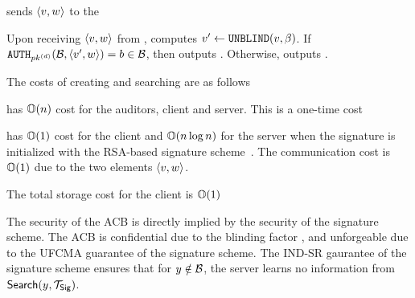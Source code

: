 \begin{algorithm}
\begin{algorithmic}[1]
\client sends $\langle \genericSigPair[1], \genericSigPair[2] \rangle$ to the \server

\State Upon receiving $\langle \genericSigPair[1], \genericSigPair[2] \rangle$ from \client, \server computes $\genericSigPairAlt[1] \assign \unblind(\genericSigPair[1], \blindingFactor)$. If 
 $\verifyRand[\auditorPubKeyOurScheme](\blocklist, \langle \genericSigPairAlt[1], \genericSigPair[2]\rangle) = \genericBlocklistElmt \in \blocklist$, then \server outputs \tru. Otherwise, \server outputs \fals. 

\EndProcedure 


\end{algorithmic}
\end{algorithm}

%
The costs of creating and searching are as follows 

\itemListStart
\item \createBlocklist has $\mathbb{O}(n)$ cost for the auditors, client and server. This is a one-time cost
\item \searchBlocklist has $\mathbb{O}(1)$ cost for the client and $\mathbb{O}(n \log n)$ for the server when the signature is initialized with the RSA-based signature scheme~\cite{ateniese2011if}. The communication cost is $\mathbb{O}(1)$ due to the two \qrGroup elements $\genericSigPair$.
\item The total storage cost for the client is $\mathbb{O}(1)$ 
\itemListEnd 


%
The security of the ACB is directly implied by the security of the signature scheme. The ACB is confidential due to the blinding factor \blindingFactor, and unforgeable due to the UFCMA guarantee of the signature scheme. The IND-SR gaurantee of the signature scheme ensures that for $\genericCInputElmt \notin \blocklist$, the server learns no information from $\searchBlocklist(\genericCInputElmt, \sigBlklistToken)$.








%


